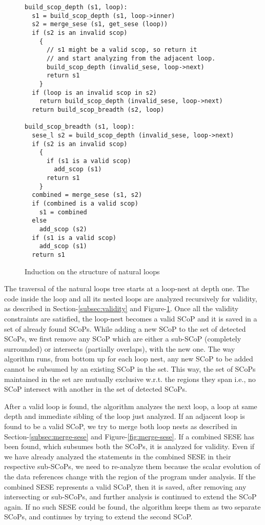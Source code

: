 \documentclass{sigplanconf}
\begin{document}
\begin{figure}
\begin{verbatim}
build_scop_depth (s1, loop):
  s1 = build_scop_depth (s1, loop->inner)
  s2 = merge_sese (s1, get_sese (loop))
  if (s2 is an invalid scop)
    {
      // s1 might be a valid scop, so return it
      // and start analyzing from the adjacent loop.
      build_scop_depth (invalid_sese, loop->next)
      return s1
    }
  if (loop is an invalid scop in s2)
    return build_scop_depth (invalid_sese, loop->next)
  return build_scop_breadth (s2, loop)

build_scop_breadth (s1, loop):
  sese_l s2 = build_scop_depth (invalid_sese, loop->next)
  if (s2 is an invalid scop)
    {
      if (s1 is a valid scop)
        add_scop (s1)
      return s1
    }
  combined = merge_sese (s1, s2)
  if (combined is a valid scop)
    s1 = combined
  else
    add_scop (s2)
  if (s1 is a valid scop)
    add_scop (s1)
  return s1
\end{verbatim}
\caption{Induction on the structure of natural loops}
\label{fig:induction}
\end{figure}

The traversal of the natural loops tree starts at a loop-nest at depth one.  The
code inside the loop and all its nested loops are analyzed recursively for
validity, as described in Section-\ref{subsec:validity} and
Figure-\ref{fig:induction}.  Once all the validity constraints are satisfied,
the loop-nest becomes a valid SCoP and it is saved in a set of
already found SCoPs. While adding a new SCoP to the set of detected SCoPs, we
first remove any SCoP which are either a sub-SCoP (completely surrounded) or
intersects (partially overlaps), with the new one. The way algorithm runs, from
bottom up for each loop nest, any new SCoP to be added cannot be subsumed by an
existing SCoP in the set. This way, the set of SCoPs maintained in the set are
mutually exclusive w.r.t. the regions they span i.e., no SCoP intersect with
another in the set of detected SCoPs.

After a valid loop is found, the algorithm analyzes the next loop, a loop at
same depth and immediate sibling of the loop just analyzed.  If an adjacent loop
is found to be a valid SCoP, we try to merge both loop nests as described in
Section-\ref{subsec:merge-sese} and Figure-\ref{fig:merge-sese}.  If a combined
SESE has been found, which subsumes both the SCoPs, it is analyzed for
validity. Even if we have already analyzed the statements in the combined SESE
in their respective sub-SCoPs, we need to re-analyze them because the scalar
evolution of the data references change with the region of the program under
analysis. If the combined SESE represents a valid SCoP, then it is saved, after
removing any intersecting or sub-SCoPs, and further analysis is continued to
extend the SCoP again.  If no such SESE could be found, the algorithm keeps them
as two separate SCoPs, and continues by trying to extend the second SCoP.
\end{document}

